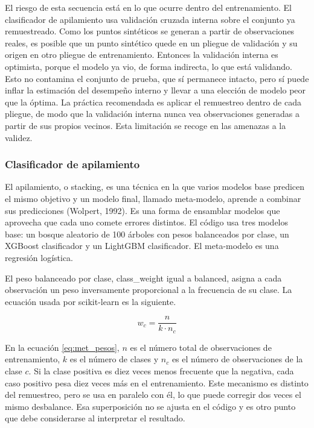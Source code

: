 El riesgo de esta secuencia está en lo que ocurre dentro del entrenamiento. El clasificador de apilamiento usa validación cruzada interna sobre el conjunto ya remuestreado. Como los puntos sintéticos se generan a partir de observaciones reales, es posible que un punto sintético quede en un pliegue de validación y su origen en otro pliegue de entrenamiento. Entonces la validación interna es optimista, porque el modelo ya vio, de forma indirecta, lo que está validando. Esto no contamina el conjunto de prueba, que sí permanece intacto, pero sí puede inflar la estimación del desempeño interno y llevar a una elección de modelo peor que la óptima. La práctica recomendada es aplicar el remuestreo dentro de cada pliegue, de modo que la validación interna nunca vea observaciones generadas a partir de sus propios vecinos. Esta limitación se recoge en las amenazas a la validez.

\subsubsection{Clasificador de apilamiento}
El apilamiento, o stacking, es una técnica en la que varios modelos base predicen el mismo objetivo y un modelo final, llamado meta-modelo, aprende a combinar sus predicciones (Wolpert, 1992). Es una forma de ensamblar modelos que aprovecha que cada uno comete errores distintos. El código usa tres modelos base: un bosque aleatorio de 100 árboles con pesos balanceados por clase, un XGBoost clasificador y un LightGBM clasificador. El meta-modelo es una regresión logística.

El peso balanceado por clase, class\_weight igual a balanced, asigna a cada observación un peso inversamente proporcional a la frecuencia de su clase. La ecuación usada por scikit-learn es la siguiente.

\begin{equation}
\label{eq:met_pesos}
w_c = \frac{n}{k \cdot n_c}
\end{equation}

En la ecuación \eqref{eq:met_pesos}, $n$ es el número total de observaciones de entrenamiento, $k$ es el número de clases y $n_c$ es el número de observaciones de la clase $c$. Si la clase positiva es diez veces menos frecuente que la negativa, cada caso positivo pesa diez veces más en el entrenamiento. Este mecanismo es distinto del remuestreo, pero se usa en paralelo con él, lo que puede corregir dos veces el mismo desbalance. Esa superposición no se ajusta en el código y es otro punto que debe considerarse al interpretar el resultado.

